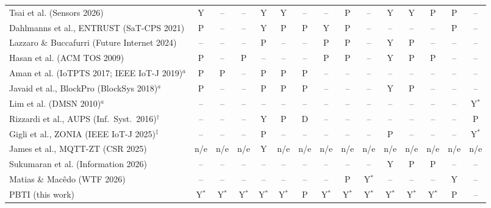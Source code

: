\documentclass[10pt,a4paper]{article}
\begin{document}
\begin{table}[!htbp]
\begin{tabular}{lcccccccccccccc}
Tsai et al. (Sensors 2026) & Y & -- & -- & Y & Y & -- & -- & P & -- & Y & Y & P & P & --\\
Dahlmanns et al., ENTRUST (SaT-CPS 2021) & P & -- & -- & Y & P & P & Y & P & -- & -- & -- & -- & P & --\\
Lazzaro \& Buccafurri (Future Internet 2024) & -- & -- & -- & P & -- & -- & P & P & -- & Y & P & -- & -- & --\\
Hasan et al. (ACM TOS 2009) & P & -- & P & -- & -- & -- & P & P & -- & Y & P & P & -- & --\\
Aman et al. (IoTPTS 2017; IEEE IoT-J 2019)$^{a}$ & P & P & -- & P & P & P & -- & -- & -- & -- & -- & -- & -- & --\\
Javaid et al., BlockPro (BlockSys 2018)$^{a}$ & P & -- & -- & P & P & P & -- & -- & -- & Y & P & -- & -- & --\\
Lim et al. (DMSN 2010)$^{a}$ & -- & -- & -- & -- & -- & -- & -- & -- & -- & -- & -- & -- & -- & Y$^{*}$\\
Rizzardi et al., AUPS (Inf.\ Syst.\ 2016)$^{\dagger}$ & -- & -- & -- & Y & P & D & -- & -- & -- & -- & -- & -- & -- & P\\
Gigli et al., ZONIA (IEEE IoT-J 2025)$^{\ddagger}$ & -- & -- & -- & P & -- & -- & -- & -- & -- & P & -- & -- & -- & Y$^{*}$\\
James et al., MQTT-ZT (CSR 2025) & n/e & n/e & n/e & Y & n/e & n/e & n/e & n/e & n/e & n/e & n/e & n/e & n/e & n/e\\
Sukumaran et al. (Information 2026) & -- & -- & -- & -- & -- & -- & -- & -- & -- & Y & P & P & -- & --\\
Matias \& Mac\^{e}do (WTF 2026) & -- & -- & -- & -- & -- & -- & -- & P & Y$^{*}$ & -- & -- & -- & Y & --\\
\midrule
PBTI (this work) & Y$^{*}$ & Y$^{*}$ & Y$^{*}$ & Y$^{*}$ & Y$^{*}$ & P & Y$^{*}$ & Y$^{*}$ & Y$^{*}$ & Y$^{*}$ & Y$^{*}$ & Y$^{*}$ & P & --\\
\bottomrule
\end{tabular}
\end{table}
\end{document}
